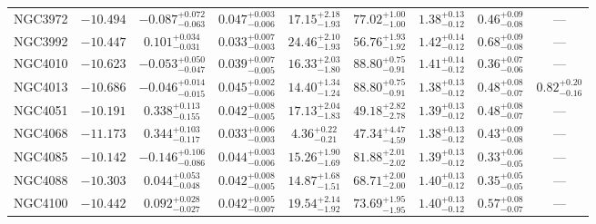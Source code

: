 \documentclass[twocolumn,tighten]{aastex63}
\begin{document}
\begin{table}
\begin{center}
\begin{tabular}{lcccccccc}
    NGC3972 & $ -10.494 $ & $ -0.087 _{ -0.063 } ^{ + 0.072 } $ & $ 0.047 _{ -0.006 } ^{ + 0.003 } $ & $ 17.15 _{ -1.93 } ^{ + 2.18 } $ & $ 77.02 _{ -1.00 } ^{ + 1.00 } $ & $ 1.38 _{ -0.12 } ^{ + 0.13 } $ & $ 0.46 _{ -0.08 } ^{ + 0.09 } $ & --- \\  
    NGC3992 & $ -10.447 $ & $ 0.101 _{ -0.031 } ^{ + 0.034 } $ & $ 0.033 _{ -0.003 } ^{ + 0.007 } $ & $ 24.46 _{ -1.93 } ^{ + 2.10 } $ & $ 56.76 _{ -1.92 } ^{ + 1.93 } $ & $ 1.42 _{ -0.12 } ^{ + 0.14 } $ & $ 0.68 _{ -0.08 } ^{ + 0.09 } $ & --- \\  
    NGC4010 & $ -10.623 $ & $ -0.053 _{ -0.047 } ^{ + 0.050 } $ & $ 0.039 _{ -0.005 } ^{ + 0.007 } $ & $ 16.33 _{ -1.80 } ^{ + 2.03 } $ & $ 88.80 _{ -0.91 } ^{ + 0.75 } $ & $ 1.41 _{ -0.12 } ^{ + 0.14 } $ & $ 0.36 _{ -0.06 } ^{ + 0.07 } $ & --- \\  
    NGC4013 & $ -10.686  $ & $ -0.046 _{ -0.015 } ^{ + 0.014 } $ & $ 0.045 _{ -0.006 } ^{ + 0.002 } $ & $ 14.40 _{ -1.24 } ^{ + 1.34 } $ & $ 88.80 _{ -0.91 } ^{ + 0.75 } $ & $ 1.38 _{ -0.12 } ^{ + 0.13 } $ & $ 0.48 _{ -0.07 } ^{ + 0.08 } $ & $ 0.82 _{ -0.16 } ^{ + 0.20 } $  \\  
    NGC4051 & $ -10.191 $ & $ 0.338 _{ -0.155 } ^{ + 0.113 } $ & $ 0.042 _{ -0.005 } ^{ + 0.008 } $ & $ 17.13 _{ -1.83 } ^{ + 2.04 } $ & $ 49.18 _{ -2.78 } ^{ + 2.82 } $ & $ 1.39 _{ -0.12 } ^{ + 0.13 } $ & $ 0.48 _{ -0.07 } ^{ + 0.08 } $ & --- \\  
    NGC4068 & $ -11.173 $ & $ 0.344 _{ -0.117 } ^{ + 0.103 } $ & $ 0.033 _{ -0.003 } ^{ + 0.006 } $ & $ 4.36 _{ -0.21 } ^{ + 0.22 } $ & $ 47.34 _{ -4.59 } ^{ + 4.47 } $ & $ 1.38 _{ -0.12 } ^{ + 0.13 } $ & $ 0.43 _{ -0.08 } ^{ + 0.09 } $ & --- \\  
    NGC4085 & $ -10.142 $ & $ -0.146 _{ -0.086 } ^{ + 0.106 } $ & $ 0.044 _{ -0.006 } ^{ + 0.003 } $ & $ 15.26 _{ -1.69 } ^{ + 1.90 } $ & $ 81.88 _{ -2.02 } ^{ + 2.01 } $ & $ 1.39 _{ -0.12 } ^{ + 0.13 } $ & $ 0.33 _{ -0.05 } ^{ + 0.06 } $ & --- \\  
    NGC4088 & $ -10.303 $ & $ 0.044 _{ -0.048 } ^{ + 0.053 } $ & $ 0.042 _{ -0.005 } ^{ + 0.008 } $ & $ 14.87 _{ -1.51 } ^{ + 1.68 } $ & $ 68.71 _{ -2.00 } ^{ + 2.00 } $ & $ 1.40 _{ -0.12 } ^{ + 0.13 } $ & $ 0.35 _{ -0.05 } ^{ + 0.05 } $ & --- \\  
    NGC4100 & $ -10.442 $ & $ 0.092 _{ -0.027 } ^{ + 0.028 } $ & $ 0.042 _{ -0.007 } ^{ + 0.005 } $ & $ 19.54 _{ -1.92 } ^{ + 2.14 } $ & $ 73.69 _{ -1.95 } ^{ + 1.95 } $ & $ 1.40 _{ -0.12 } ^{ + 0.13 } $ & $ 0.57 _{ -0.07 } ^{ + 0.08 } $ & --- \\  

\end{tabular}
\end{center}
\end{table}
\end{document}
